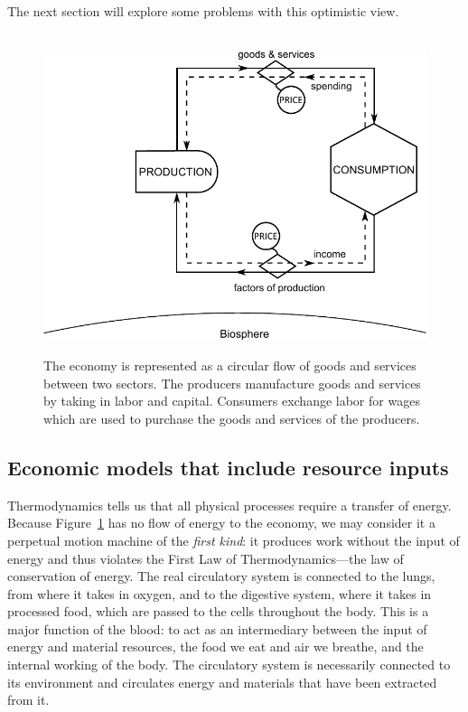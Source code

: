 The next section will explore some problems with this
optimistic view.

\begin{figure}[!ht]
\centering\
\includegraphics[width=\linewidth]{Part_0/Chapter_Introduction/images/Perpetual_motion_1.pdf}
\caption[The traditional economic model of the economy]{The economy 
is represented as a circular flow of goods and services between two sectors. 
The producers manufacture goods and services 
by taking in labor and capital. 
Consumers exchange labor for wages 
which are used to purchase 
the goods and services of the producers.}
\label{fig:perp_motion_1}
\end{figure}

\subsection{Economic models that include resource inputs}
\label{sec:metaphor_resource}

Thermodynamics tells us that all physical processes require
a transfer of energy.
Because Figure~\ref{fig:perp_motion_1} has no flow of energy
to the economy,
we may consider it a perpetual motion machine
of the \emph{first kind}:
it produces work without the input of energy and
thus violates the First Law of Thermodynamics---the 
law of conservation of energy.\cite{Rao2004}
The real circulatory system is connected to the lungs,
from where it takes in oxygen,
and to the digestive system, 
where it takes in processed food,
which are passed to the cells throughout the body.
This is a major function of the blood:
to act as an intermediary between the input of energy
and material resources,
the food we eat and air we breathe,
and the internal working of the body.
The circulatory system is necessarily connected 
to its environment and circulates energy and materials
that have been extracted from it.

